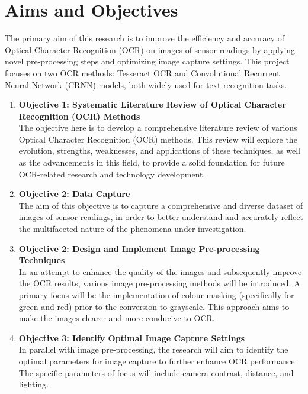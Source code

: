\section{Aims and Objectives}
The primary aim of this research is to improve the efficiency and accuracy of Optical Character Recognition (OCR) on images of sensor readings by applying novel pre-processing steps and optimizing image capture settings. This project focuses on two OCR methods: Tesseract OCR and Convolutional Recurrent Neural Network (CRNN) models, both widely used for text recognition tasks.

\begin{enumerate}

      \item \textbf{Objective 1: Systematic Literature Review of Optical Character Recognition (OCR) Methods}\\
            The objective here is to develop a comprehensive literature review of various Optical Character Recognition (OCR) methods. This review will explore the evolution, strengths, weaknesses, and applications of these techniques, as well as the advancements in this field, to provide a solid foundation for future OCR-related research and technology development.


      \item \textbf{Objective 2: Data Capture}\\
            The aim of this objective is to capture a comprehensive and diverse dataset of images of sensor readings, in order to better understand and accurately reflect the multifaceted nature of the phenomena under investigation.

      \item \textbf{Objective 2: Design and Implement Image Pre-processing Techniques}\\
            In an attempt to enhance the quality of the images and subsequently improve the OCR results, various image pre-processing methods will be introduced. A primary focus will be the implementation of colour masking (specifically for green and red) prior to the conversion to grayscale. This approach aims to make the images clearer and more conducive to OCR.

      \item \textbf{Objective 3: Identify Optimal Image Capture Settings}\\
            In parallel with image pre-processing, the research will aim to identify the optimal parameters for image capture to further enhance OCR performance. The specific parameters of focus will include camera contrast, distance, and lighting.


\end{enumerate}
